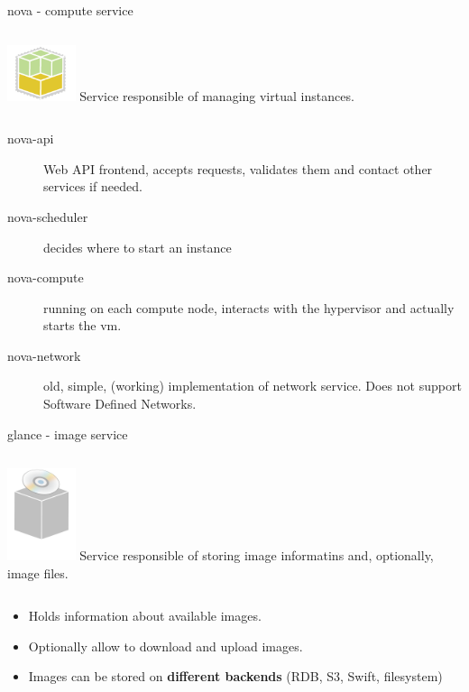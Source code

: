 \documentclass[english,serif,mathserif,usenames,dvipsnames]{beamer}
\begin{document}
\begin{frame}
  {nova - compute service}
  \begin{columns}
    \column{2cm}
    \includegraphics[width=2cm]{openstack-compute-icon.png}
    \column{8cm}
    Service responsible of managing virtual instances.
  \end{columns}
  \begin{description}
  \item[nova-api] Web API frontend, accepts requests, validates them
    and contact other services if needed.
  \item[nova-scheduler] decides where to start an instance
  \item[nova-compute] running on each compute node, interacts with the
    hypervisor and actually starts the vm.
  \item[nova-network] old, simple, (working) implementation of network
    service. Does not support Software Defined Networks.
  \end{description}
\end{frame}

\begin{frame}
  {glance - image service}
  \begin{columns}
    \column{2cm}
    \includegraphics[width=2cm]{glance-icon.png}
    \column{8cm}
    Service responsible of storing image informatins and, optionally,
    image files.
  \end{columns}

  \+
  \begin{itemize}
  \item Holds information about available images.
  \item Optionally allow to download and upload images.
  \item Images can be stored on \textbf{different backends} (RDB, S3,
    Swift, filesystem)
  \end{itemize}
\end{frame}
\end{document}
